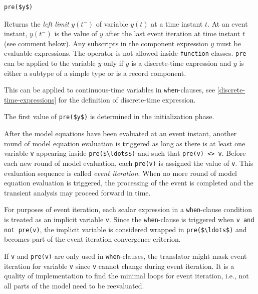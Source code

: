 \begin{operatordefinition}[pre]
\begin{synopsis}\begin{lstlisting}
pre($y$)
\end{lstlisting}\end{synopsis}
\begin{semantics}
Returns the \emph{left limit} $y(t^{-})$ of variable $y(t)$ at a time instant $t$.
At an event instant, $y(t^{-})$ is the value of $y$ after the last event iteration at time instant $t$ (see comment below).
Any subscripts in the component expression $y$ must be evaluable expressions.
The operator is not allowed inside \lstinline!function! classes.
\lstinline!pre! can be applied to the variable $y$ only if $y$ is a discrete-time expression and $y$ is either a subtype of a simple type or is a record component.
\begin{nonnormative}
This can be applied to continuous-time variables in \lstinline!when!-clauses, see \cref{discrete-time-expressions} for the definition of discrete-time expression.
\end{nonnormative}
The first value of \lstinline!pre($y$)! is determined in the initialization phase.

After the model equations have been evaluated at an event instant, another round of model equation evaluation is triggered as long as there is at least one variable \lstinline!v! appearing inside \lstinline!pre($\ldots$)! and such that \lstinline!pre(v) <> v!.
Before each new round of model evaluation, each \lstinline!pre(v)! is assigned the value of \lstinline!v!.
This evaluation sequence is called \emph{event iteration}.
When no more round of model equation evaluation is triggered, the processing of the event is completed and the transient analysis may proceed forward in time.

For purposes of event iteration, each scalar expression in a \lstinline!when!-clause condition is treated as an implicit variable \lstinline!v!.
Since the \lstinline!when!-clause is triggered when \lstinline!v and not pre(v)!, the implicit variable is considered wrapped in \lstinline!pre($\ldots$)! and becomes part of the event iteration convergence criterion.

\begin{nonnormative}
If \lstinline!v! and \lstinline!pre(v)! are only used in \lstinline!when!-clauses, the translator might mask event iteration for variable \lstinline!v! since \lstinline!v! cannot change during event iteration.
It is a quality of implementation to find the minimal loops for event iteration, i.e., not all parts of the model need to be reevaluated.


\end{nonnormative}
\end{semantics}
\end{operatordefinition}
